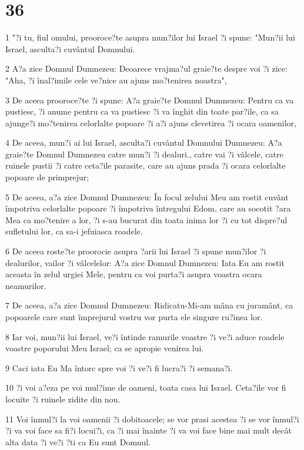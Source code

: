 \chapter{36}

\par 1 "?i tu, fiul omului, prooroce?te asupra mun?ilor lui Israel ?i spune: "Mun?ii lui Israel, asculta?i cuvântul Domnului.
\par 2 A?a zice Domnul Dumnezeu: Deoarece vrajma?ul graie?te despre voi ?i zice: "Aha, ?i înal?imile cele ve?nice au ajuns mo?tenirea noastra",
\par 3 De aceea prooroce?te ?i spune: A?a graie?te Domnul Dumnezeu: Pentru ca va pustiesc, ?i anume pentru ca va pustiesc ?i va înghit din toate par?ile, ca sa ajunge?i mo?tenirea celorlalte popoare ?i a?i ajuns clevetirea ?i ocara oamenilor,
\par 4 De aceea, mun?i ai lui Israel, asculta?i cuvântul Domnului Dumnezeu: A?a graie?te Domnul Dumnezeu catre mun?i ?i dealuri., catre vai ?i vâlcele, catre ruinele pustii ?i catre ceta?ile parasite, care au ajuns prada ?i ocara celorlalte popoare de primprejur;
\par 5 De aceea, a?a zice Domnul Dumnezeu: În focul zelului Meu am rostit cuvânt împotriva celorlalte popoare ?i împotriva întregului Edom, care au socotit ?ara Mea ca mo?tenire a lor, ?i s-au bucurat din toata inima lor ?i cu tot dispre?ul sufletului lor, ca sa-i jefuiasca roadele.
\par 6 De aceea roste?te proorocie asupra ?arii lui Israel ?i spune mun?ilor ?i dealurilor, vailor ?i vâlcelelor: A?a zice Domnul Dumnezeu: Iata Eu am rostit aceasta în zelul urgiei Mele, pentru ca voi purta?i asupra voastra ocara neamurilor.
\par 7 De aceea, a?a zice Domnul Dumnezeu: Ridicatu-Mi-am mâna cu juramânt, ca popoarele care sunt împrejurul vostru vor purta ele singure ru?inea lor.
\par 8 Iar voi, mun?ii lui Israel, ve?i întinde ramurile voastre ?i ve?i aduce roadele voastre poporului Meu Israel; ca se apropie venirea lui.
\par 9 Caci iata Eu Ma întorc spre voi ?i ve?i fi lucra?i ?i semana?i.
\par 10 ?i voi a?eza pe voi mul?ime de oameni, toata casa lui Israel. Ceta?ile vor fi locuite ?i ruinele zidite din nou.
\par 11 Voi înmul?i la voi oamenii ?i dobitoacele; se vor prasi acestea ?i se vor înmul?i ?i va voi face sa fi?i locui?i, ca ?i mai înainte ?i va voi face bine mai mult decât alta data ?i ve?i ?ti ca Eu sunt Domnul.
